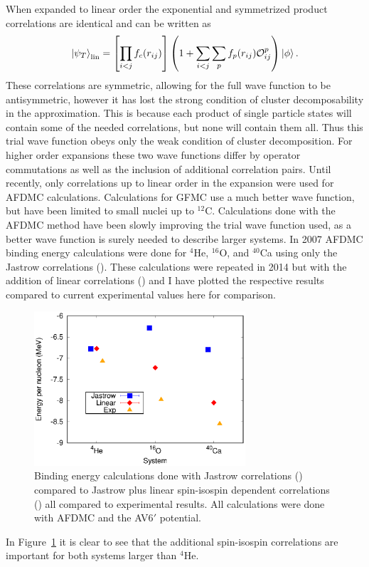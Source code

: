 When expanded to linear order the exponential and symmetrized product correlations are identical and can be written as
\begin{equation}
   \left| \psi_T \right>_\text{lin} = \left[\prod\limits_{i<j}f_c(r_{ij})\right] \left(1+\sum\limits_{i<j}\sum\limits_pf_p(r_{ij})\mathcal{O}_{ij}^p\right) \left| \phi \right>.
   \label{equ:linearcorr}
\end{equation}
These correlations are symmetric, allowing for the full wave function to be antisymmetric, however it has lost the strong condition of cluster decomposability in the approximation. This is because each product of single particle states will contain some of the needed correlations, but none will contain them all. Thus this trial wave function obeys only the weak condition of cluster decomposition. For higher order expansions these two wave functions differ by operator commutations as well as the inclusion of additional correlation pairs. Until recently, only correlations up to linear order in the expansion were used for AFDMC calculations. Calculations for GFMC use a much better wave function, but have been limited to small nuclei up to $^{12}$C. Calculations done with the AFDMC method have been slowly improving the trial wave function used, as a better wave function is surely needed to describe larger systems. In 2007 AFDMC binding energy calculations were done for $^4$He, $^{16}$O, and $^{40}$Ca using only the Jastrow correlations (\cite{gandolfi2007}). These calculations were repeated in 2014 but with the addition of linear correlations (\cite{gandolfi2014}) and I have plotted the respective results compared to current experimental values here for comparison.
\begin{figure}[h!]
   \centering
   \includegraphics[width=0.7\textwidth]{figures/energy_jaslin.eps}
   \caption{Binding energy calculations done with Jastrow correlations (\cite{gandolfi2007}) compared to Jastrow plus linear spin-isospin dependent correlations (\cite{gandolfi2014}) all compared to experimental results. All calculations were done with AFDMC and the AV6$'$ potential.}
   \label{fig:energy_jaslin}
\end{figure}
In Figure~\ref{fig:energy_jaslin} it is clear to see that the additional spin-isospin correlations are important for both systems larger than $^4$He.

